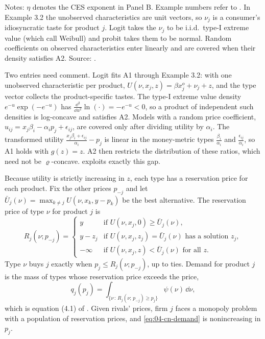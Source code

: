 \begin{table}[htbp]
  \par\smallskip
  \begin{minipage}{\textwidth}\footnotesize
  Notes: $\eta$ denotes the CES exponent in Panel B. Example numbers refer to \citet{CaplinNalebuff1991}. In
  Example 3.2 the unobserved characteristics are unit vectors, so $\nu_j$ is a consumer's idiosyncratic taste for
  product $j$. Logit takes the $\nu_j$ to be i.i.d.\ type-I extreme value (which \citet{CaplinNalebuff1991} call
  Weibull) and probit takes them to be normal. Random coefficients on observed characteristics enter linearly and
  are covered when their density satisfies A2. Source: \citet[pp.~6--9]{CaplinNalebuff1991}.
  \end{minipage}
\end{table}

Two entries need comment. Logit fits A1 through Example 3.2: with one unobserved characteristic per product,
$U(\nu, x_j, z) = \beta x^{o}_j + \nu_j + z$, and the type vector collects the product-specific tastes. The type-I
extreme value density $e^{-u}\exp(-e^{-u})$ has $\frac{\dd^2}{\dd u^2}\ln(\cdot) = -e^{-u} < 0$, so a product of
independent such densities is log-concave and satisfies A2. Models with a random price coefficient,
$u_{ij} = x_j\beta_i - \alpha_i p_j + \epsilon_{ij}$, are covered only after dividing utility by $\alpha_i$. The
transformed utility $\frac{x_j\beta_i + \epsilon_{ij}}{\alpha_i} - p_j$ is linear in the money-metric types
$\frac{\beta_i}{\alpha_i}$ and $\frac{\epsilon_{ij}}{\alpha_i}$, so A1 holds with $g(z) = z$. A2 then restricts the
distribution of these ratios, which need not be $\varrho$-concave.  exploits exactly this
gap.

Because utility is strictly increasing in $z$, each type has a reservation price for each product. Fix the
other prices $p_{-j}$ and let $\bar U_j(\nu) = \max_{k \neq j}U(\nu, x_k, y - p_k)$ be the best alternative.
The reservation price of type $\nu$ for product $j$ is
\[
  R_j(\nu; p_{-j}) =
  \begin{cases}
    y & \text{if } U(\nu, x_j, 0) \ge \bar U_j(\nu),\\
    y - z_j & \text{if } U(\nu, x_j, z_j) = \bar U_j(\nu) \text{ has a solution } z_j,\\
    -\infty & \text{if } U(\nu, x_j, z) < \bar U_j(\nu) \text{ for all } z.
  \end{cases}
\]
Type $\nu$ buys $j$ exactly when $p_j \le R_j(\nu; p_{-j})$, up to ties. Demand for product $j$ is the mass of
types whose reservation price exceeds the price,
\begin{equation}\label{eq:04-cn-demand}
  q_j(p_j) = \int_{\{\nu \,:\, R_j(\nu;\, p_{-j}) \ge p_j\}}\psi(\nu)\,\dd\nu,
\end{equation}
which is equation (4.1) of \citet{CaplinNalebuff1991}. Given rivals' prices, firm $j$ faces a monopoly problem
with a population of reservation prices, and \eqref{eq:04-cn-demand} is nonincreasing in $p_j$.

